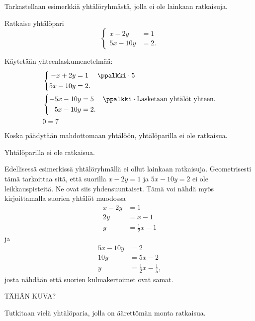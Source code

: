 
Tarkastellaan esimerkkiä yhtälöryhmästä, jolla ei ole lainkaan ratkaisuja.

\begin{esimerkki}
Ratkaise yhtälöpari
\[
\left\{
\begin{aligned}
x-2y&= 1 \\
5x-10y&= 2.
\end{aligned}
\right.
\]
\begin{esimratk}
Käytetään yhteenlaskumenetelmää:
\begin{align*}
&\left\{
\begin{aligned}
-x+2y&= 1 && \ppalkki \cdot 5 \\
5x-10y&= 2. &&
\end{aligned}
\right. \\
&\left\{
\begin{aligned}
-5x-10y&= 5 && \ppalkki \cdot \text{Lasketaan yhtälöt yhteen.} \\
5x-10y&= 2. &&
\end{aligned}
\right. \\
&0=7 \\
\end{align*}
Koska päädytään mahdottomaan yhtälöön, yhtälöparilla ei ole ratkaisua.
\end{esimratk}
\begin{esimvast}
Yhtälöparilla ei ole ratkaisua.
\end{esimvast}
\end{esimerkki}

Edellisessä esimerkissä yhtälöryhmällä ei ollut lainkaan ratkaisuja. Geometrisesti tämä tarkoittaa sitä, että suorilla $x-2y= 1$ ja $5x-10y= 2$ ei ole leikkauspisteitä. Ne ovat siis yhdensuuntaiset.
Tämä voi nähdä myös kirjoittamalla suorien yhtälöt muodossa
\begin{align*}
  x-2y &= 1 \\
  2y &= x - 1 \\
  y &= \frac{1}{2}x -1
\end{align*}
ja
\begin{align*}
  5x-10y &= 2 \\
  10y &= 5x -2 \\
  y &= \frac{1}{2}x - \frac{1}{5},
\end{align*}
josta nähdään että suorien kulmakertoimet ovat samat.

TÄHÄN KUVA?

Tutkitaan vielä yhtälöparia, jolla on äärettömän monta ratkaisua.


